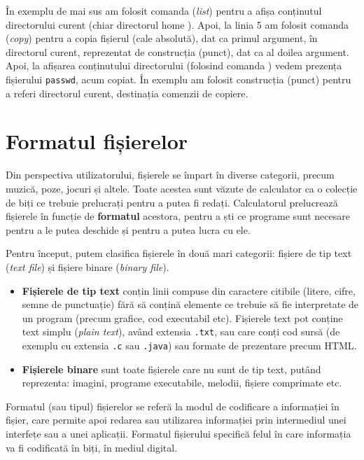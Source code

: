 În exemplu de mai sus am folosit comanda  (\textit{list}) pentru a afișa conținutul directorului curent (chiar directorul home ).
Apoi, la linia 5 am folosit comanda  (\textit{copy}) pentru a copia fișierul  (cale absolută), dat ca primul argument, în directorul curent, reprezentat de construcția  (punct), dat ca al doilea argument.
Apoi, la afișarea conținutului directorului (folosind comanda ) vedem prezența fișierului \texttt{passwd}, acum copiat.
În exemplu am folosit construcția  (punct) pentru a referi directorul curent, destinația comenzii de copiere.

\section{Formatul fișierelor}
\label{sec:fs:file-format}

Din perspectiva utilizatorului, fișierele se împart în diverse categorii, precum muzică, poze, jocuri și altele.
Toate acestea sunt văzute de calculator ca o colecție de biți ce trebuie prelucrați pentru a putea fi redați.
Calculatorul prelucrează fișierele în funcție de \textbf{formatul} acestora, pentru a ști ce programe sunt necesare pentru a le putea deschide și pentru a putea lucra cu ele.

Pentru început, putem clasifica fișierele în două mari categorii: fișiere de tip text (\textit{text file}) și fișiere binare (\textit{binary file}).

\begin{itemize}
  \item \textbf{Fișierele de tip text} conțin linii compuse din caractere citibile (litere, cifre, semne de punctuație) fără să conțină elemente ce trebuie să fie interpretate de un program (precum grafice, cod executabil etc).
    Fișierele text pot conține text simplu (\textit{plain text}), având extensia \texttt{.txt}, sau care conți cod sursă (de exemplu cu extensia \texttt{.c} sau \texttt{.java}) sau formate de prezentare precum HTML.
  \item \textbf{Fișierele binare} sunt toate fișierele care nu sunt de tip text, putând reprezenta: imagini, programe executabile, melodii, fișiere comprimate etc.
\end{itemize}

Formatul (sau tipul) fișierelor se referă la modul de codificare a informației în fișier, care permite apoi redarea sau utilizarea informației prin intermediul unei interfețe sau a unei aplicații.
Formatul fișierului specifică felul în care informația va fi codificată în biți, în mediul digital.

